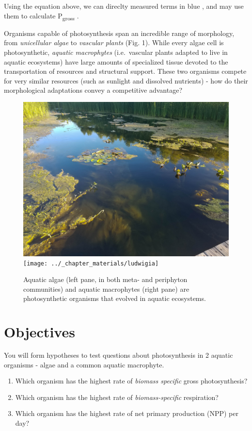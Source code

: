 \documentclass[11pt,]{article}
\begin{document}
Using the equation above, we can direclty measured terms in \color{blue}
blue \color{black}, and may use them to calculate \color{red}
P\textsubscript{gross} \color{black}.

Organisms capable of photosynthesis span an incredible range of
morphology, from \emph{unicellular algae} to \emph{vascular plants}
(Fig. 1). While every algae cell is photosynthetic, \emph{aquatic
macrophytes} (i.e.~vascular plants adapted to live in aquatic
ecosystems) have large amounts of specialized tissue devoted to the
transportation of resources and structural support. These two organisms
compete for very similar resources (such as sunlight and dissolved
nutrients) - how do their morphological adaptations convey a competitive
advantage?

\begin{figure}
\includegraphics[width=0.5\linewidth]{../_chapter_materials/aquatic_photosynthesis} \texttt{[image: ../\_chapter\_materials/ludwigia]} \caption{Aquatic algae (left pane, in both meta- and periphyton communities) and aquatic macrophytes (right pane) are photosynthetic organisms that evolved in aquatic ecosystems.}\label{fig:organisms}
\end{figure}

\section{Objectives}\label{objectives}

You will form hypotheses to test questions about photosynthesis in 2
aquatic organisms - algae and a common aquatic macrophyte.

\begin{enumerate}
\def\labelenumi{\arabic{enumi}.}
\item
  Which organism has the highest rate of \emph{biomass specific} gross
  photosynthesis?
\item
  Which organism has the highest rate of \emph{biomass-specific}
  respiration?
\item
  Which organism has the highest rate of net primary production (NPP)
  per day?
\end{enumerate}
\end{document}
